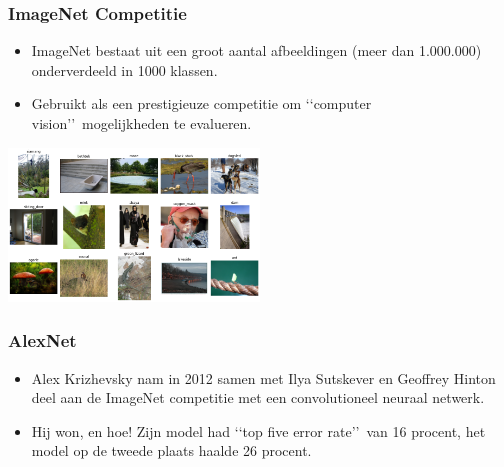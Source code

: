 \documentclass[aspectratio=169]{beamer}
\begin{document}
%



\begin{frame}
\frametitle{ImageNet Competitie}

\begin{itemize}
\item ImageNet bestaat uit een groot aantal afbeeldingen (meer dan 1.000.000) onderverdeeld in 1000 klassen.
\item Gebruikt als een prestigieuze competitie om \lq\lq computer vision\rq\rq\ mogelijkheden te evalueren.
\end{itemize}

\begin{center}
\includegraphics[width=0.50\textwidth]{graphics/imagenet-dogsled}
\end{center}

\end{frame}

\begin{frame}
\frametitle{AlexNet}

\begin{itemize}
	\item Alex Krizhevsky nam in 2012 samen met Ilya Sutskever en Geoffrey Hinton deel aan de ImageNet competitie met een convolutioneel neuraal netwerk.
	\item Hij won, en hoe! Zijn model had \lq\lq top five error rate\rq\rq\ van 16 procent, het model 
	op de tweede plaats haalde 26 procent.
\end{itemize}

\end{frame}
\end{document}
